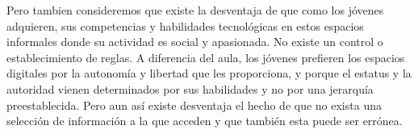 Pero tambien consideremos que existe la desventaja de que como los jóvenes adquieren, sus competencias y habilidades tecnológicas en estos espacios informales donde su actividad es social y apasionada. No existe un control o establecimiento de reglas. A diferencia del aula, los jóvenes prefieren los espacios digitales por la autonomía y libertad que les proporciona, y porque el estatus y la autoridad vienen determinados por sus habilidades y no por una jerarquía preestablecida\cite{vid09}. Pero aun así existe desventaja el hecho de que no exista una selección de información a la que acceden y que también esta puede ser errónea. 
\\[1pt]


